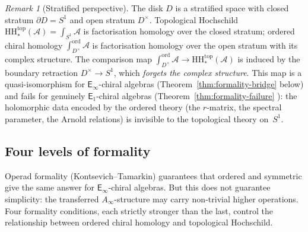 \documentclass[11pt,reqno]{amsart}
\theoremstyle{definition}
\theoremstyle{remark}
\newtheorem{remark}[theorem]{Remark}
\newcommand{\cA}{\mathcal{A}}
\newcommand{\HH}{\mathrm{HH}}
\newcommand{\Ainf}{A_{\infty}}
\newcommand{\Eone}{\mathsf{E}_{1}}
\newcommand{\Einf}{\mathsf{E}_{\infty}}
\numberwithin{equation}{section}
\begin{document}
\begin{remark}[Stratified perspective]
\label{rem:stratified-disk}
The disk $D$ is a stratified space with closed stratum
$\partial D = S^1$ and open stratum $D^\times$.
Topological Hochschild
$\HH^{\mathrm{top}}_*(\cA) = \int_{S^1}\cA$ is
factorisation homology over the closed stratum;
ordered chiral homology $\int_{D^\times}^{\mathrm{ord}}\cA$
is factorisation homology over the open stratum with its
complex structure.
The comparison map
$\int_{D^\times}^{\mathrm{ord}} \cA \to
\HH^{\mathrm{top}}_*(\cA)$ is induced by the boundary
retraction $D^\times \to S^1$, which \emph{forgets the
complex structure}. This map is a quasi-isomorphism for
$\Einf$-chiral algebras
\textup{(}Theorem~\textup{\ref{thm:formality-bridge}}
below\textup{)} and fails for genuinely $\Eone$-chiral
algebras
\textup{(}Theorem~\textup{\ref{thm:formality-failure}}%
\textup{)}:
the holomorphic data encoded by the ordered theory
\textup{(}the $r$-matrix, the spectral parameter, the
Arnold relations\textup{)} is invisible to the topological
theory on~$S^1$.
\end{remark}

\subsection{Four levels of formality}
\label{subsec:formality}

Operad formality (Kontsevich--Tamarkin) guarantees that
ordered and symmetric give the same answer for
$\Einf$-chiral algebras. But this does not guarantee
simplicity: the transferred $\Ainf$-structure may carry
non-trivial higher operations. Four formality conditions,
each strictly stronger than the last, control the
relationship between ordered chiral homology and
topological Hochschild.
\end{document}
